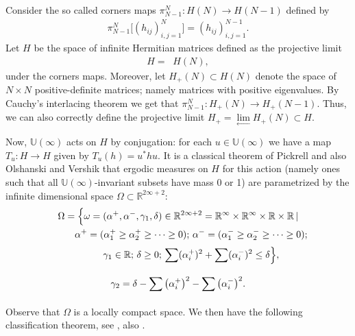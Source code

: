 \documentclass[11pt]{article}
\numberwithin{equation}{section}
\begin{document}
Consider the so called corners maps $\pi^N_{N-1}\colon H(N)\to H(N-1)$ defined by
\begin{align}\label{Corners}
\pi_{N-1}^N\big[(h_{ij})_{i,j=1}^N\big]= (h_{ij} )_{i,j=1}^{N-1}.
\end{align}
Let $H$ be the space of infinite Hermitian matrices defined as the projective limit
\begin{gather*}
H=\mathop{\underset{\leftarrow}{\lim}}H(N),
\end{gather*}
under the corners maps. Moreover, let $H_+(N)\subset H(N)$ denote the space of $N \times N$ positive-definite matrices; namely matrices with positive eigenvalues. By Cauchy's interlacing theorem we get that $\pi^N_{N-1}\colon H_+(N)\to H_+(N-1)$. Thus, we can also correctly define the projective limit $H_+=\underset{\leftarrow}{\lim}H_+(N) \subset H$.

Now, $\mathbb{U}(\infty)$ acts on $H$ by conjugation: for each $u \in \mathbb{U}(\infty)$ we have a map $T_u\colon H \to H$ given by $T_u(h)=u^*hu$. It is a classical theorem of Pickrell \cite{Pickrell} and also Olshanski and Vershik \cite{OlshanskiVershik} that ergodic measures on $H$ for this action (namely ones such that all $\mathbb{U}(\infty)$-invariant subsets have mass 0 or 1) are parametrized by the infinite dimensional space $\Omega \subset \mathbb{R}^{2\infty+2}$:
\begin{gather}
\Omega =\Big\{\omega=(\alpha^+,\alpha^-,\gamma_1,\delta)\in \mathbb{R}^{2\infty+2}=\mathbb{R}^\infty \times \mathbb{R}^\infty \times \mathbb{R} \times \mathbb{R}\,|\nonumber\\
\hphantom{\Omega =\Big\{}{}\alpha^+ =(\alpha_1^+\ge \alpha_2^+\ge \cdots \ge 0) ; \, \alpha^-=(\alpha_1^-\ge \alpha_2^-\ge \cdots \ge 0);\nonumber\\
\hphantom{\Omega =\Big\{}{} \gamma_1 \in \mathbb{R} ;\, \delta \ge 0 ;\,\sum_{}^{}(\alpha_i^+)^2 + \sum_{}^{}(\alpha_i^-)^2\le \delta \Big\},\nonumber\\
 \gamma_2=\delta-\sum_{}^{}\big(\alpha_i^+\big)^2 - \sum_{}^{}\big(\alpha_i^-\big)^2.\label{Omegadefinition}
\end{gather}
Observe that $\Omega$ is a locally compact space. We then have the following classification theorem, see \cite{OlshanskiVershik,Pickrell}, also \cite{Defosseux}.
\end{document}
